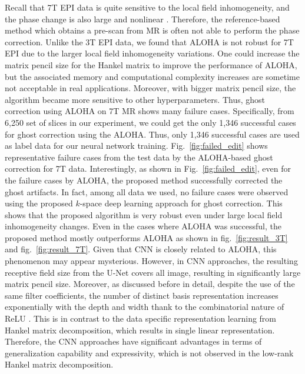 \documentclass[num-refs]{wiley-article}
\newcommand{\0}{{\boldsymbol{0}}}
\newcommand{\1}{\blmath{1}}
\begin{document}
	
	
	Recall that 7T EPI data is quite sensitive to the local field inhomogeneity, and the phase change is also large and nonlinear \cite{Hoge2016dual}. Therefore, the reference-based method which obtains a pre-scan from MR is often not able to perform the phase correction. Unlike the 3T EPI data, we found that ALOHA is not robust for 7T EPI due to the larger local field inhomogeneity variations. One could increase the matrix pencil size for the Hankel matrix to improve the performance of ALOHA, but the associated memory and computational complexity increases are sometime not acceptable in real applications. Moreover, with bigger matrix pencil size, the algorithm became more sensitive to other hyperparameters. Thus, ghost correction using ALOHA on 7T MR shows many failure cases. Specifically, from 6,250 set of slices in our experiment, we could get the only 1,346 successful cases for  ghost correction using the ALOHA. Thus, only 1,346 successful cases are used as label data for our neural network training.
	Fig.~\ref{fig:failed_edit} shows representative failure cases from the test data by the ALOHA-based ghost correction for 7T data. Interestingly, as shown in Fig.~\ref{fig:failed_edit}, even for the failure cases by ALOHA, the proposed method successfully corrected the ghost artifacts. In fact, among all data we used, no failure cases were observed using the proposed $k$-space deep learning approach for ghost correction. This shows that the proposed algorithm is very robust even under large local field inhomogeneity changes. Even in the cases where ALOHA was successful, the proposed method mostly outperforms ALOHA as shown in fig.~\ref{fig:result_3T} and fig.~\ref{fig:result_7T}. 
	Given that CNN is closely related to ALOHA, this phenomenon may appear mysterious.
	However, in CNN approaches, the resulting receptive field size from the U-Net covers all image, resulting in significantly large	matrix pencil size.  
	Moreover, as discussed before in detail, despite the use of the same filter coefficients, the number of distinct basis representation increases exponentially with the depth and width thank to the combinatorial nature of ReLU \cite{ye2019understanding}. This is in contrast to the data specific representation learning from Hankel matrix decomposition, which results in single linear representation. Therefore, the CNN approaches have significant advantages in terms of generalization capability and expressivity, which is not observed in the low-rank Hankel matrix decomposition.
	
\end{document}
